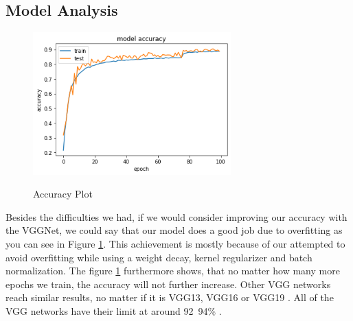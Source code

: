 \documentclass[journal]{IEEEtran}
\begin{document}
\subsection{Model Analysis}
\begin{figure}
  \begin{center}
  \includegraphics[width=3in]{photo/accuracy.png}\\
  \caption{Accuracy  Plot}\label{acc}
  \end{center}
\end{figure}
Besides the difficulties we had, if we would consider improving our accuracy with the VGGNet, we could say that our model does a good job due to overfitting as you can see in Figure \ref{acc}. This achievement is mostly because of our attempted to avoid overfitting while using a weight decay, kernel regularizer and batch normalization. The figure \ref{acc} furthermore shows, that no matter how many more epochs we train, the accuracy will not further increase. Other VGG networks reach similar results, no matter if it is VGG13, VGG16 or VGG19 \cite{RN16}. All of the VGG networks have their limit at around 92~94\% \cite{RN17}.

\ifCLASSOPTIONcaptionsoff
  \newpage
\fi



\listoffigures

\vfill
\end{document}
